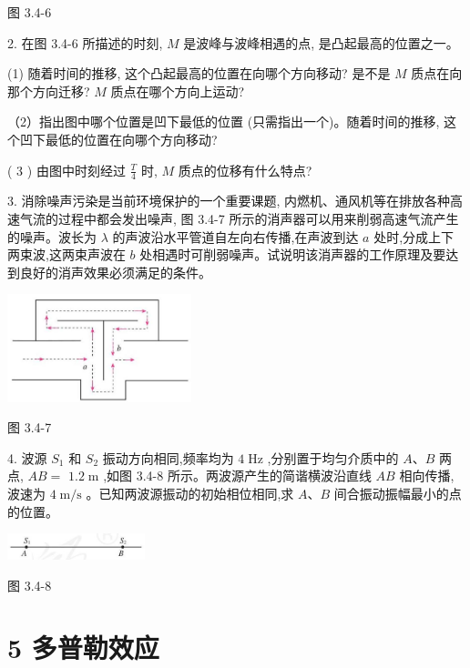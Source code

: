 \documentclass[10pt]{article}
\begin{document}
图 3.4-6

2. 在图 3.4-6 所描述的时刻, \(M\) 是波峰与波峰相遇的点, 是凸起最高的位置之一。

(1) 随着时间的推移, 这个凸起最高的位置在向哪个方向移动? 是不是 \(M\) 质点在向那个方向迁移? \(M\) 质点在哪个方向上运动?

（2）指出图中哪个位置是凹下最低的位置 (只需指出一个)。随着时间的推移, 这个凹下最低的位置在向哪个方向移动?

( 3 ) 由图中时刻经过 \(\frac{T}{4}\) 时, \(M\) 质点的位移有什么特点?

3. 消除噪声污染是当前环境保护的一个重要课题, 内燃机、通风机等在排放各种高速气流的过程中都会发出噪声, 图 3.4-7 所示的消声器可以用来削弱高速气流产生的噪声。波长为 \(\lambda\) 的声波沿水平管道自左向右传播,在声波到达 \(a\) 处时,分成上下两束波,这两束声波在 \(b\) 处相遇时可削弱噪声。试说明该消声器的工作原理及要达到良好的消声效果必须满足的条件。

\begin{center}
\includegraphics[max width=0.4\textwidth]{images/01910e4c-ebb8-7d2c-8f2f-2375bc1d2d12_83_642862.jpg}
\end{center}

图 3.4-7

4. 波源 \({S}_{1}\) 和 \({S}_{2}\) 振动方向相同,频率均为 \(4\mathrm{\;{Hz}}\) ,分别置于均匀介质中的 \(A\text{、}B\) 两点, \({AB} =\) \({1.2}\mathrm{\;m}\) ,如图 3.4-8 所示。两波源产生的简谐横波沿直线 \({AB}\) 相向传播,波速为 \(4\mathrm{\;m}/\mathrm{s}\) 。已知两波源振动的初始相位相同,求 \(A\text{、}B\) 间合振动振幅最小的点的位置。

\begin{center}
\includegraphics[max width=0.3\textwidth]{images/01910e4c-ebb8-7d2c-8f2f-2375bc1d2d12_83_607935.jpg}
\end{center}

图 3.4-8

\section*{5 多普勒效应}
\end{document}
